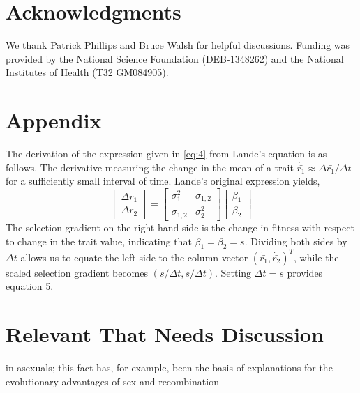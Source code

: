\documentclass[9pt,twocolumn,twoside]{gsajnl}
\begin{document}


\section*{Acknowledgments}
\label{sec:acknowledgments}
We thank Patrick Phillips and Bruce Walsh for helpful discussions. Funding was provided by the National Science Foundation (DEB-1348262) and the National Institutes of Health (T32 GM084905).


\section*{Appendix}
The derivation of the expression given in \ref{eq:4} from Lande's equation is as follows. The derivative measuring the change in the mean of a trait $\dot{\bar{r_1}} \approx \Delta \bar{r_1}/\Delta t$ for a sufficiently small interval of time. Lande's original expression yields,
\[
\left[
\begin{array}{c}
\Delta \bar{r_1} \\
\Delta \bar{r_2} 
\end{array}
\right]
=
\left[
\begin{array}{cc}
\sigma_1^2 & \sigma_{1,2} \\
\sigma_{1,2} & \sigma_2^2 
\end{array}
\right]
\left[
\begin{array}{c}
\beta_1 \\
\beta_2 
\end{array}
\right]
\]
The selection gradient on the right hand side is the change in fitness with respect to change in the trait value, indicating that $\beta_1=\beta_2=s$. Dividing both sides by $\Delta t$ allows us to equate the left side to the column vector $(\dot{\bar{r_1}},\dot{\bar{r_2}})^T$, while the scaled selection gradient becomes $(s/\Delta t,s/\Delta t)$. Setting $\Delta t = s$ provides equation 5.   

\section{Relevant That Needs Discussion}
in asexuals; this fact has, for example, been the basis of explanations for the evolutionary advantages of sex and recombination \citep{Barton2005,Otto2009}
\end{document}

